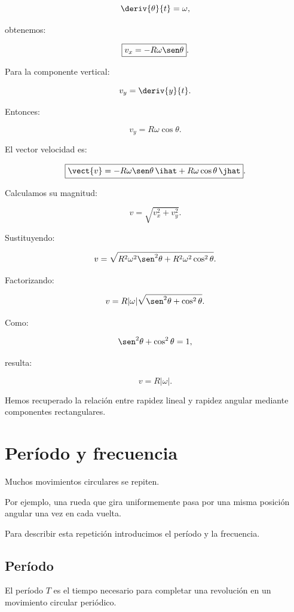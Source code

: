 \[
\deriv{\theta}{t}=\omega,
\]

obtenemos:

\[
\boxed{
v_x=-R\omega\sen\theta
}.
\]

Para la componente vertical:

\[
v_y=\deriv{y}{t}.
\]

Entonces:

\[
\boxed{
v_y=R\omega\cos\theta
}.
\]

El vector velocidad es:

\[
\boxed{
\vect{v}
=
-R\omega\sen\theta\,\ihat
+
R\omega\cos\theta\,\jhat
}.
\]

Calculamos su magnitud:

\[
v
=
\sqrt{v_x^2+v_y^2}.
\]

Sustituyendo:

\[
v
=
\sqrt{
R^2\omega^2\sen^2\theta
+
R^2\omega^2\cos^2\theta
}.
\]

Factorizando:

\[
v
=
R|\omega|
\sqrt{\sen^2\theta+\cos^2\theta}.
\]

Como:

\[
\sen^2\theta+\cos^2\theta=1,
\]

resulta:

\[
\boxed{
v=R|\omega|
}.
\]

Hemos recuperado la relación entre rapidez lineal y rapidez angular mediante
componentes rectangulares.


\section{Período y frecuencia}

Muchos movimientos circulares se repiten.

Por ejemplo, una rueda que gira uniformemente pasa por una misma posición
angular una vez en cada vuelta.

Para describir esta repetición introducimos el período y la frecuencia.


\subsection{Período}

\begin{definicion}[Período]

El período \(T\) es el tiempo necesario para completar una revolución en un
movimiento circular periódico.

\end{definicion}

